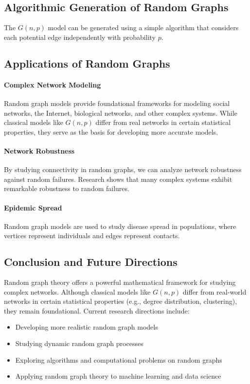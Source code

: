 \documentclass[oneside]{book}
\begin{document}
\subsection{Algorithmic Generation of Random Graphs}
The $G(n,p)$ model can be generated using a simple algorithm that considers each potential edge independently with probability $p$.

\subsection{Applications of Random Graphs}

\paragraph{Complex Network Modeling}
Random graph models provide foundational frameworks for modeling social networks, the Internet, biological networks, and other complex systems. While classical models like $G(n,p)$ differ from real networks in certain statistical properties, they serve as the basis for developing more accurate models.

\paragraph{Network Robustness}
By studying connectivity in random graphs, we can analyze network robustness against random failures. Research shows that many complex systems exhibit remarkable robustness to random failures.

\paragraph{Epidemic Spread}
Random graph models are used to study disease spread in populations, where vertices represent individuals and edges represent contacts.

\subsection{Conclusion and Future Directions}
Random graph theory offers a powerful mathematical framework for studying complex networks. Although classical models like $G(n,p)$ differ from real-world networks in certain statistical properties (e.g., degree distribution, clustering), they remain foundational. Current research directions include:
\begin{itemize}
\item Developing more realistic random graph models
\item Studying dynamic random graph processes
\item Exploring algorithms and computational problems on random graphs
\item Applying random graph theory to machine learning and data science
\end{itemize}
\end{document}
